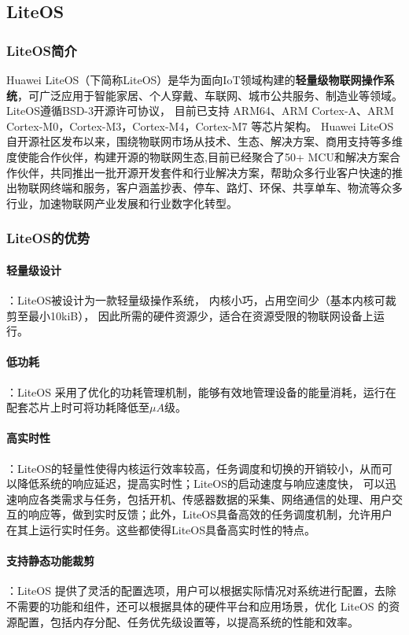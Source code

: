 \documentclass{article}
\begin{document}
\subsection{LiteOS}
\subsubsection{LiteOS简介}
Huawei LiteOS（下简称LiteOS）是华为面向IoT领域构建的\textbf{轻量级物联网操作系统}，可广泛应用于智能家居、个人穿戴、车联网、城市公共服务、制造业等领域。LiteOS遵循BSD-3开源许可协议， 目前已支持 ARM64、ARM Cortex-A、ARM Cortex-M0，Cortex-M3，Cortex-M4，Cortex-M7 等芯片架构\supercite{ref4}。
Huawei LiteOS自开源社区发布以来，围绕物联网市场从技术、生态、解决方案、商用支持等多维度使能合作伙伴，构建开源的物联网生态,目前已经聚合了50+ MCU和解决方案合作伙伴，共同推出一批开源开发套件和行业解决方案，帮助众多行业客户快速的推出物联网终端和服务，客户涵盖抄表、停车、路灯、环保、共享单车、物流等众多行业，加速物联网产业发展和行业数字化转型。
\subsubsection{LiteOS的优势}
\noindent
\paragraph{轻量级设计}：LiteOS被设计为一款轻量级操作系统， 内核小巧，占用空间少（基本内核可裁剪至最小10kiB）， 因此所需的硬件资源少，适合在资源受限的物联网设备上运行。\\

\paragraph{低功耗}：LiteOS 采用了优化的功耗管理机制，能够有效地管理设备的能量消耗，运行在配套芯片上时可将功耗降低至$\mu A$级\supercite{ref4}。\\
\paragraph{高实时性}：LiteOS的轻量性使得内核运行效率较高，任务调度和切换的开销较小，从而可以降低系统的响应延迟，提高实时性；LiteOS的启动速度与响应速度快， 可以迅速响应各类需求与任务，包括开机、传感器数据的采集、网络通信的处理、用户交互的响应等，做到实时反馈；此外，LiteOS具备高效的任务调度机制，允许用户在其上运行实时任务。这些都使得LiteOS具备高实时性的特点。\\
\paragraph{支持静态功能裁剪}：LiteOS 提供了灵活的配置选项，用户可以根据实际情况对系统进行配置，去除不需要的功能和组件，还可以根据具体的硬件平台和应用场景，优化 LiteOS 的资源配置，包括内存分配、任务优先级设置等，以提高系统的性能和效率。
\end{document}
